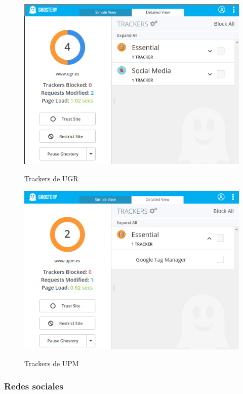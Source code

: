 \documentclass[10pt,a4paper]{article}
\begin{document}
\begin{figure}[H]
  \centering
  \includegraphics[scale=0.6]{ghost_ugr.png}\\
  \caption{Trackers de UGR}
  \label{fig:object}
\end{figure}

\begin{figure}[H]
  \centering
  \includegraphics[scale=0.6]{ghost_upm.png}\\
  \caption{Trackers de UPM}
  \label{fig:object}
\end{figure}


\subsubsection*{Redes sociales}
\end{document}
